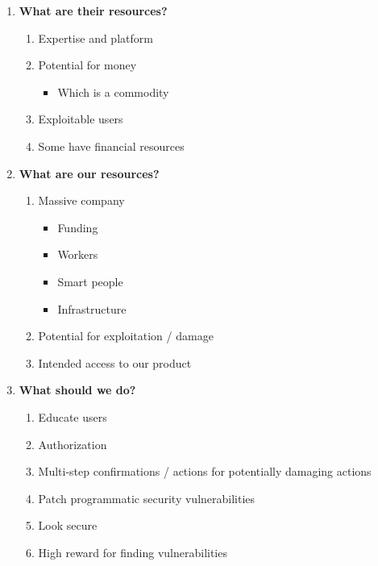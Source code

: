 \documentclass[letterpaper]{article}
\begin{document}
\begin{enumerate}
\item \textbf{What are their resources?}

\begin{enumerate}
\item Expertise and platform
\item Potential for money

\begin{itemize}
\item Which is a commodity
\end{itemize}

\item Exploitable users
\item Some have financial resources
\end{enumerate}

\item \textbf{What are our resources?}

\begin{enumerate}
\item Massive company

\begin{itemize}
\item Funding
\item Workers
\item Smart people
\item Infrastructure
\end{itemize}

\item Potential for exploitation / damage
\item Intended access to our product
\end{enumerate}

\item \textbf{What should we do?}

\begin{enumerate}
\item Educate users
\item Authorization
\item Multi-step confirmations / actions for potentially damaging
actions
\item Patch programmatic security vulnerabilities
\item Look secure
\item High reward for finding vulnerabilities
\end{enumerate}
\end{enumerate}
\end{document}
